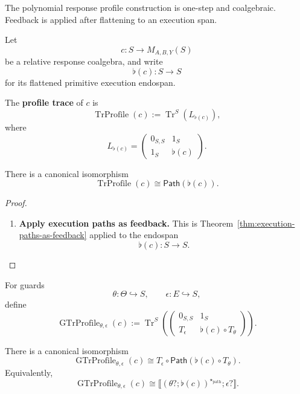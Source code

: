 The polynomial response profile construction is one-step and coalgebraic.
Feedback is applied after flattening to an execution span.

Let
\[
  c:S\longrightarrow M_{A,B,Y}(S)
\]
be a relative response coalgebra, and write
\[
  \flat(c):S\to S
\]
for its flattened primitive execution endospan.

\begin{definition}
\label{def:profile-trace-feedback}
The \textbf{profile trace} of \(c\) is
\[
  \operatorname{TrProfile}(c)
  :=
  \operatorname{Tr}^{S}(L_{\flat(c)}),
\]
where
\[
  L_{\flat(c)}
  =
  \begin{pmatrix}
    0_{S,S} & 1_S\\
    1_S & \flat(c)
  \end{pmatrix}.
\]
\end{definition}

\begin{proposition}
\label{prop:profile-trace-after-flattening}
There is a canonical isomorphism
\[
  \operatorname{TrProfile}(c)
  \cong
  \mathsf{Path}(\flat(c)).
\]
\end{proposition}

\begin{proof}
\begin{enumerate}
  \item \textbf{Apply execution paths as feedback.}
  This is Theorem~\ref{thm:execution-paths-as-feedback} applied to the
  endospan
  \[
    \flat(c):S\to S.
  \]
\end{enumerate}
\end{proof}

For guards
\[
  \theta:\Theta\hookrightarrow S,
  \qquad
  \epsilon:E\hookrightarrow S,
\]
define
\[
  \operatorname{GTrProfile}_{\theta,\epsilon}(c)
  :=
  \operatorname{Tr}^{S}
  \left(
    \begin{pmatrix}
      0_{S,S} & 1_S\\
      T_\epsilon & \flat(c)\circ T_\theta
    \end{pmatrix}
  \right).
\]

\begin{proposition}
\label{prop:guarded-profile-trace-after-flattening}
There is a canonical isomorphism
\[
  \operatorname{GTrProfile}_{\theta,\epsilon}(c)
  \cong
  T_\epsilon\circ
  \mathsf{Path}(\flat(c)\circ T_\theta).
\]
Equivalently,
\[
  \operatorname{GTrProfile}_{\theta,\epsilon}(c)
  \cong
  \llbracket
    (\theta?;\flat(c))^{\star_{\mathrm{path}}};\epsilon?
  \rrbracket .
\]
\end{proposition}

